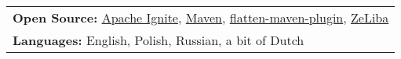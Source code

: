 \documentclass{article}
\begin{document}
\begin{longtable}{p{0.00in}p{0.00in}p{0.0in}p{0.00in}p{0.00in}}
\multicolumn{5}{p{\dimexpr7.00in+8\tabcolsep\relax}}{
    \textbf{Open Source:}
    \href{https://github.com/apache/ignite/commits?author=dehasi}{Apache Ignite},
    \href{https://github.com/apache/maven/commits?author=dehasi}{Maven},
    \href{https://github.com/mojohaus/flatten-maven-plugin/commits?author=dehasi}{flatten-maven-plugin},
    \href{https://github.com/dehasi/zeliba}{ZeLiba}
\par} \\

\multicolumn{5}{p{\dimexpr7.00in+8\tabcolsep\relax}}{
    \textbf{Languages:} English, Polish, Russian, a bit of Dutch
} \\

\end{longtable}
\end{document}
